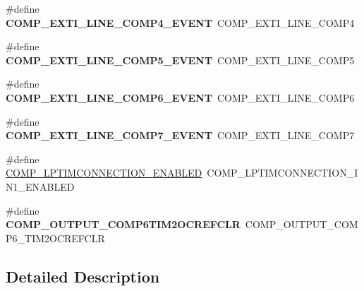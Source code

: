 \begin{DoxyCompactItemize}
\item 
\mbox{\label{group___h_a_l___c_o_m_p___aliased___defines_ga7e682dbcdc2deedaa2b2854b7256b742}} 
\#define {\bfseries C\+O\+M\+P\+\_\+\+E\+X\+T\+I\+\_\+\+L\+I\+N\+E\+\_\+\+C\+O\+M\+P4\+\_\+\+E\+V\+E\+NT}~C\+O\+M\+P\+\_\+\+E\+X\+T\+I\+\_\+\+L\+I\+N\+E\+\_\+\+C\+O\+M\+P4
\item 
\mbox{\label{group___h_a_l___c_o_m_p___aliased___defines_gad0def6714ebe83bd131d6f62f12bf6b7}} 
\#define {\bfseries C\+O\+M\+P\+\_\+\+E\+X\+T\+I\+\_\+\+L\+I\+N\+E\+\_\+\+C\+O\+M\+P5\+\_\+\+E\+V\+E\+NT}~C\+O\+M\+P\+\_\+\+E\+X\+T\+I\+\_\+\+L\+I\+N\+E\+\_\+\+C\+O\+M\+P5
\item 
\mbox{\label{group___h_a_l___c_o_m_p___aliased___defines_ga92c1033ac0c380c9f879660af7c62616}} 
\#define {\bfseries C\+O\+M\+P\+\_\+\+E\+X\+T\+I\+\_\+\+L\+I\+N\+E\+\_\+\+C\+O\+M\+P6\+\_\+\+E\+V\+E\+NT}~C\+O\+M\+P\+\_\+\+E\+X\+T\+I\+\_\+\+L\+I\+N\+E\+\_\+\+C\+O\+M\+P6
\item 
\mbox{\label{group___h_a_l___c_o_m_p___aliased___defines_ga7f18b1fe252971b1976e906c2c7d4be7}} 
\#define {\bfseries C\+O\+M\+P\+\_\+\+E\+X\+T\+I\+\_\+\+L\+I\+N\+E\+\_\+\+C\+O\+M\+P7\+\_\+\+E\+V\+E\+NT}~C\+O\+M\+P\+\_\+\+E\+X\+T\+I\+\_\+\+L\+I\+N\+E\+\_\+\+C\+O\+M\+P7
\item 
\#define \hyperlink{group___h_a_l___c_o_m_p___aliased___defines_ga65ddf63ba987dab413920ad8f65e22d1}{C\+O\+M\+P\+\_\+\+L\+P\+T\+I\+M\+C\+O\+N\+N\+E\+C\+T\+I\+O\+N\+\_\+\+E\+N\+A\+B\+L\+ED}~C\+O\+M\+P\+\_\+\+L\+P\+T\+I\+M\+C\+O\+N\+N\+E\+C\+T\+I\+O\+N\+\_\+\+I\+N1\+\_\+\+E\+N\+A\+B\+L\+ED
\item 
\mbox{\label{group___h_a_l___c_o_m_p___aliased___defines_ga74dbd1a72efdaee104678a256383976f}} 
\#define {\bfseries C\+O\+M\+P\+\_\+\+O\+U\+T\+P\+U\+T\+\_\+\+C\+O\+M\+P6\+T\+I\+M2\+O\+C\+R\+E\+F\+C\+LR}~C\+O\+M\+P\+\_\+\+O\+U\+T\+P\+U\+T\+\_\+\+C\+O\+M\+P6\+\_\+\+T\+I\+M2\+O\+C\+R\+E\+F\+C\+LR
\end{DoxyCompactItemize}


\subsection{Detailed Description}


